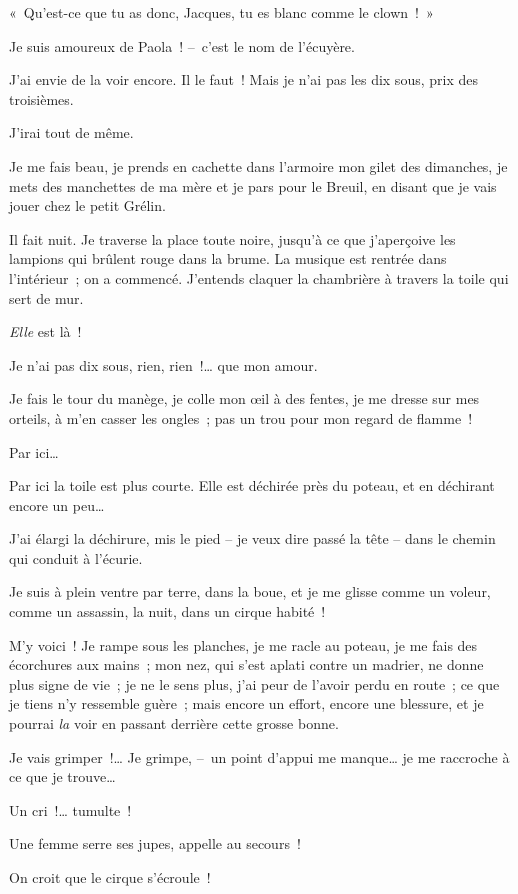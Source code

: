 \documentclass[french,twoside]{book} %
\begin{document}
« Qu’est-ce que tu as donc, Jacques, tu es blanc comme le clown ! »\par
\bigbreak
\noindent Je suis amoureux de Paola ! – c’est le nom de l’écuyère.\par
J’ai envie de la voir encore. Il le faut ! Mais je n’ai pas les dix sous, prix des troisièmes.\par
J’irai tout de même.\par
Je me fais beau, je prends en cachette dans l’armoire mon gilet des dimanches, je mets des manchettes de ma mère et je pars pour le Breuil, en disant que je vais jouer chez le petit Grélin.\par
Il fait nuit. Je traverse la place toute noire, jusqu’à ce que j’aperçoive les lampions qui brûlent rouge dans la brume. La musique est rentrée dans l’intérieur ; on a commencé. J’entends claquer la chambrière à travers la toile qui sert de mur.\par
\emph{Elle} est là !\par
Je n’ai pas dix sous, rien, rien !… que mon amour.\par
Je fais le tour du manège, je colle mon œil à des fentes, je me dresse sur mes orteils, à m’en casser les ongles ; pas un trou pour mon regard de flamme !\par
\bigbreak
\noindent Par ici…\par
Par ici la toile est plus courte. Elle est déchirée près du poteau, et en déchirant encore un peu…\par
J’ai élargi la déchirure, mis le pied – je veux dire passé la tête – dans le chemin qui conduit à l’écurie.\par
Je suis à plein ventre par terre, dans la boue, et je me glisse comme un voleur, comme un assassin, la nuit, dans un cirque habité !\par
M’y voici ! Je rampe sous les planches, je me racle au poteau, je me fais des écorchures aux mains ; mon nez, qui s’est aplati contre un madrier, ne donne plus signe de vie ; je ne le sens plus, j’ai peur de l’avoir perdu en route ; ce que je tiens n’y ressemble guère ; mais encore un effort, encore une blessure, et je pourrai \emph{la} voir en passant derrière cette grosse bonne.\par
Je vais grimper !… Je grimpe, – un point d’appui me manque… je me raccroche à ce que je trouve…\par
Un cri !… tumulte !\par
Une femme serre ses jupes, appelle au secours !\par
On croit que le cirque s’écroule !\par
\end{document}
